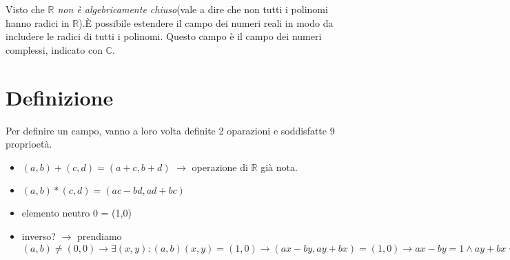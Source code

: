 Visto che \emph{$\mathbb{R}$ non è algebricamente chiuso}(vale a dire che non tutti i polinomi hanno radici in $\mathbb{R}$).\`E possibile estendere il campo dei numeri reali in modo da includere le radici di tutti i polinomi. Questo campo è il campo dei numeri complessi, indicato con $\mathbb{C}$.
\section{Definizione}
Per definire un campo, vanno a loro volta definite 2 oparazioni e soddisfatte 9 proprioetà.\\
\begin{itemize}
    \item $(a,b) + (c,d) = (a+c,b+d)$ $\to$ operazione di $\mathbb{R}$ già nota.
    \item $(a,b) * (c,d) = (ac-bd,ad+bc)$
    \item elemento neutro $0$ = (1,0)
    \item inverso? $\to$ prendiamo $(a,b) \neq (0,0) \to \exists (x,y) : (a,b)(x,y)=(1,0) \to (ax-by,ay+bx)=(1,0) \to ax-by=1 \land ay+bx=0 \to x=\frac{a}{a^2+b^2} \land y=\frac{-b}{a^2+b^2}$
\end{itemize}